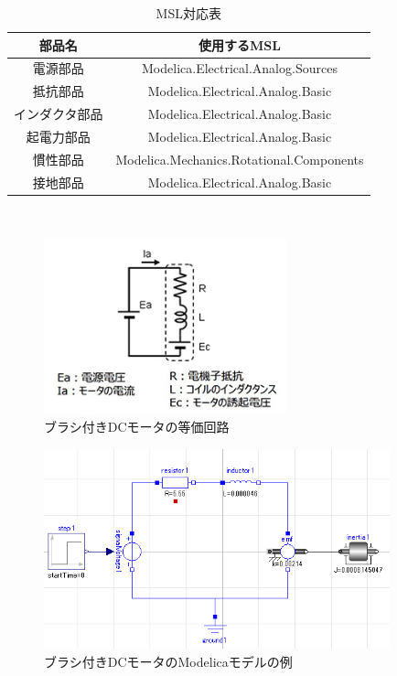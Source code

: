 \begin{table}[t]
	\centering
	\caption{MSL対応表}
	\begin{tabular}{|c|c|} \hline
	  部品名 & 使用するMSL \\ \hline \hline
	  電源部品 & Modelica.Electrical.Analog.Sources \\ \hline
	  抵抗部品 & Modelica.Electrical.Analog.Basic \\ \hline
	  インダクタ部品 & Modelica.Electrical.Analog.Basic \\ \hline
	  起電力部品 & Modelica.Electrical.Analog.Basic \\ \hline
	  慣性部品 & Modelica.Mechanics.Rotational.Components \\ \hline
	  接地部品 & Modelica.Electrical.Analog.Basic \\ \hline
	\end{tabular}
	\label{tab:MSL}
  \end{table}
　
\begin{figure}[t]
	\centering
	\includegraphics[width=7cm]{./Image/touka.png}
	\caption{ブラシ付きDCモータの等価回路}
	\label{fig:touka}
  \end{figure}

\begin{figure}[t]
  \centering
  \includegraphics[width=10cm]{./Image/tantai_model.png}
  \caption{ブラシ付きDCモータのModelicaモデルの例}
  \label{fig:tantai_model}
\end{figure}


